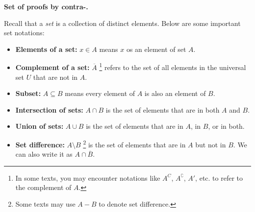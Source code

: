 \documentclass[11pt,addpoints]{exam}
\begin{document}
\begin{questions}
    \question \textbf{Set of proofs by contra-.}
    
    Recall that a \emph{set} is a collection of distinct elements. Below are some important set notations:
    \begin{itemize}
        \item \textbf{Elements of a set:} $x \in A$ means $x$ os an element of set $A$. 
        \item \textbf{Complement of a set:} $\overline{A}$ \footnote{In some texts, you may encounter notations like $A^C$, $A^\complement$, $A'$, etc. to refer to the complement of $A$.} refers to the set of all elements in the universal set $U$ that are not in $A$.
        \item \textbf{Subset:} $A \subseteq B$ means every element of $A$ is also an element of $B$. 
        \item \textbf{Intersection of sets:} $A \cap B$ is the set of elements that are in both $A$ and $B$. 
        \item \textbf{Union of sets:} $A \cup B$ is the set of elements that are in $A$, in $B$, or in both.
        \item \textbf{Set difference:} $A \setminus B$ \footnote{Some texts may use $A - B$ to denote set difference.} is the set of elements that are in $A$ but not in $B$. We can also write it as $A \cap \overline{B}$.
    \end{itemize}

\end{questions}
\end{document}
